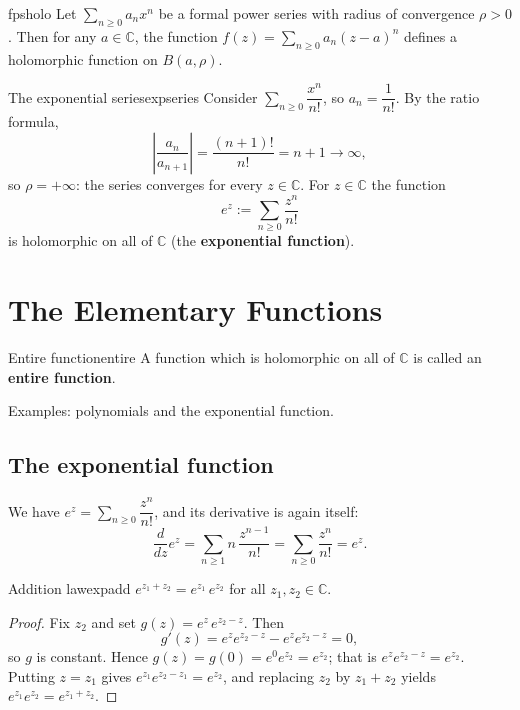 \documentclass[11pt,openany]{report}
\newcommand{\C}{\mathbb{C}}
\begin{document}
\begin{corollary}{}{fpsholo}
Let $\sum_{n\ge0}a_n x^n$ be a formal power series with radius of convergence $\rho>0$.
Then for any $a\in\C$, the function $f(z)=\sum_{n\ge0}a_n(z-a)^n$ defines a holomorphic
function on $B(a,\rho)$.
\end{corollary}

\begin{example}{The exponential series}{expseries}
Consider $\sum_{n\ge0}\dfrac{x^n}{n!}$, so $a_n=\dfrac1{n!}$. By the ratio formula,
\[
  \left\lvert\frac{a_n}{a_{n+1}}\right\rvert = \frac{(n+1)!}{n!} = n+1 \to\infty,
\]
so $\rho=+\infty$: the series converges for every $z\in\C$. For $z\in\C$ the function
\[
  e^z := \sum_{n\ge0}\frac{z^n}{n!}
\]
is holomorphic on all of $\C$ (the \textbf{exponential function}).
\end{example}


\chapter{The Elementary Functions}

\begin{definition}{Entire function}{entire}
A function which is holomorphic on all of $\C$ is called an \textbf{entire function}.
\end{definition}
Examples: polynomials and the exponential function.

\section{The exponential function}

We have $e^z=\sum_{n\ge0}\dfrac{z^n}{n!}$, and its derivative is again itself:
\[
  \frac{d}{dz}e^z = \sum_{n\ge1} n\,\frac{z^{n-1}}{n!} = \sum_{n\ge0}\frac{z^n}{n!} = e^z.
\]

\begin{theorem}{Addition law}{expadd}
$e^{z_1+z_2} = e^{z_1}\,e^{z_2}$ for all $z_1,z_2\in\C$.
\end{theorem}

\begin{proof}
Fix $z_2$ and set $g(z)=e^{z}\,e^{z_2-z}$. Then
\[
  g'(z) = e^{z}e^{z_2-z} - e^{z}e^{z_2-z} = 0,
\]
so $g$ is constant. Hence $g(z)=g(0)=e^{0}e^{z_2}=e^{z_2}$; that is
$e^{z}e^{z_2-z}=e^{z_2}$. Putting $z=z_1$ gives $e^{z_1}e^{z_2-z_1}=e^{z_2}$, and
replacing $z_2$ by $z_1+z_2$ yields $e^{z_1}e^{z_2}=e^{z_1+z_2}$.
\end{proof}
\end{document}
